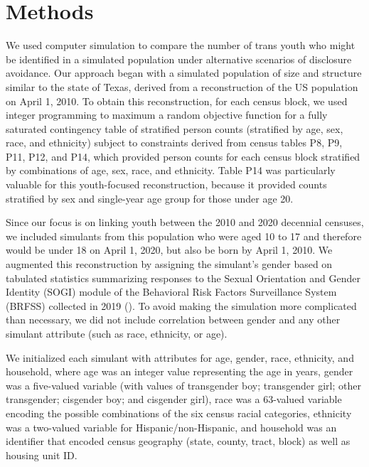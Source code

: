 \documentclass{jpc} %
\theoremstyle{plain}\newtheorem{satz}[thm]{Satz} %
\begin{document}
 \section*{Methods}

We used computer simulation to compare the number of trans youth who might be identified in a simulated population under alternative scenarios of disclosure avoidance.  Our approach began with a simulated population of size and structure similar to the state of Texas, derived from a reconstruction of the US population on April 1, 2010.  To obtain this reconstruction, for each census block, we used integer programming to maximum a random objective function for a fully saturated contingency table of stratified person counts (stratified by age, sex, race, and ethnicity) subject to constraints derived from census tables P8, P9, P11, P12, and P14, which provided person counts for each census block stratified by combinations of age, sex, race, and ethnicity.  Table P14 was particularly valuable for this youth-focused reconstruction, because it provided counts stratified by sex and single-year age group for those under age 20.

Since our focus is on linking youth between the 2010 and 2020 decennial censuses, we included simulants from this population who were aged 10 to 17 and therefore would be under 18 on April 1, 2020, but also be born by April 1, 2010.  We augmented this reconstruction by assigning the simulant's gender based on tabulated statistics summarizing responses to the Sexual Orientation and Gender Identity (SOGI) module of the Behavioral Risk Factors Surveillance System (BRFSS) collected in 2019 (\cite{brfss2019}). To avoid making the simulation more complicated than necessary, we did not include correlation between gender and any other simulant attribute (such as race, ethnicity, or age).

We initialized each simulant with attributes for age, gender, race, ethnicity, and household, where age was an integer value representing the age in years, gender was a five-valued variable (with values of transgender boy; transgender girl; other transgender; cisgender boy; and cisgender girl), race was a 63-valued variable encoding the possible combinations of the six census racial categories, ethnicity was a two-valued variable for Hispanic/non-Hispanic, and household was an identifier that encoded census geography (state, county, tract, block) as well as housing unit ID.
\end{document}
